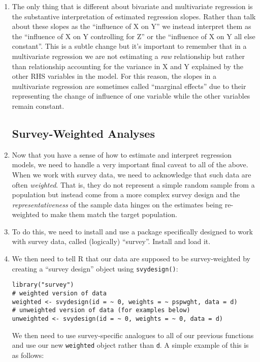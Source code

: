 \documentclass[a4paper,12pt]{article}
\begin{document}
\begin{enumerate}
\item The only thing that is different about bivariate and multivariate regression is the substantive interpretation of estimated regression slopes. Rather than talk about these slopes as the ``influence of X on Y'' we instead interpret them as the ``influence of X on Y controlling for Z'' or the ``influence of X on Y all else constant''. This is a subtle change but it's important to remember that in a multivariate regression we are not estimating a \textit{raw} relationship but rather than relationship accounting for the variance in X and Y explained by the other RHS variables in the model. For this reason, the slopes in a multivariate regression are sometimes called ``marginal effects'' due to their representing the change of influence of one variable while the other variables remain constant.

\subsection{Survey-Weighted Analyses}

\item Now that you have a sense of how to estimate and interpret regression models, we need to handle a very important final caveat to all of the above. When we work with survey data, we need to acknowledge that such data are often \textit{weighted}. That is, they do not represent a simple random sample from a population but instead come from a more complex survey design and the \textit{representativeness} of the sample data hinges on the estimates being re-weighted to make them match the target population. 

\item To do this, we need to install and use a package specifically designed to work with survey data, called (logically) ``survey''. Install and load it.

\item We then need to tell R that our data are supposed to be survey-weighted by creating a ``survey design'' object using \texttt{svydesign()}:

\begin{verbatim}
library("survey")
# weighted version of data
weighted <- svydesign(id = ~ 0, weights = ~ pspwght, data = d)
# unweighted version of data (for examples below)
unweighted <- svydesign(id = ~ 0, weights = ~ 0, data = d)
\end{verbatim}

\noindent We then need to use survey-specific analogues to all of our previous functions and use our new \texttt{weighted} object rather than \texttt{d}. A simple example of this is as follows:


\end{enumerate}
\end{document}
